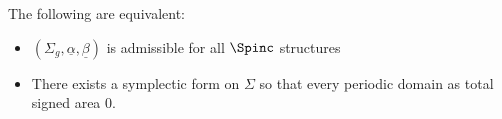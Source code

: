 
    The following are equivalent:
    \begin{itemize}
        \item $(\Sigma_g, \underline \alpha, \underline \beta)$ is admissible for all $\Spinc$ structures
        \item There exists a symplectic form on $\Sigma$ so that every periodic domain as total signed area 0. 
    \end{itemize}
